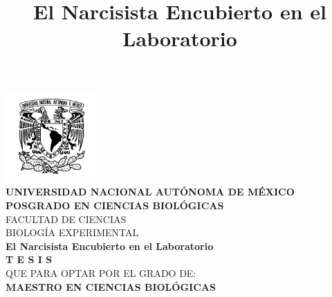 \documentclass[
]{article}
\title{El Narcisista Encubierto en el Laboratorio}
\begin{document}

\pagestyle{plain} %


\begin{titlepage}
    \begin{center}
        \vspace*{-1.5cm} %
        
        \includegraphics[width=3.5cm]{ figuras/unam.png }\\[0.5cm]
        
        {\large \textbf{UNIVERSIDAD NACIONAL AUTÓNOMA DE MÉXICO}}\\[0.4cm]
        
        {\large \textbf{\MakeUppercase{Posgrado en Ciencias
Biológicas}}}\\[0.3cm]
        
        {\large \MakeUppercase{Facultad de Ciencias}}\\[0.2cm]
        {\large \MakeUppercase{Biología Experimental}}\\[1cm]
        
        {\Large \textbf{El Narcisista Encubierto en el
Laboratorio}}\\[1cm]
        
        {\LARGE \textbf{T E S I S}}\\[0.5cm]
        
        {\large QUE PARA OPTAR POR EL GRADO DE:}\\[0.3cm]
        {\Large \textbf{MAESTRO EN CIENCIAS BIOLÓGICAS}}\\[1cm]
        

\end{center}
\end{titlepage}
\end{document}
